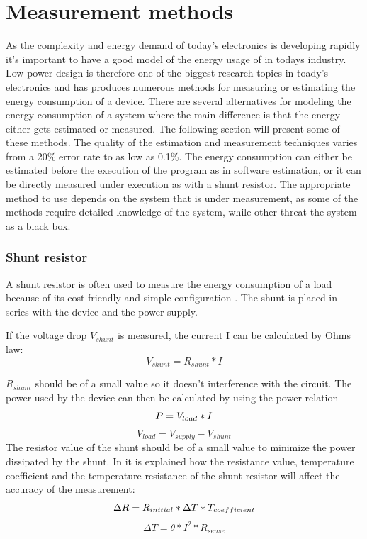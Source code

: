 \section{Measurement methods}
As the complexity and energy demand of today's electronics is developing rapidly it's  important to have a good model of the energy usage of in todays industry. Low-power design is therefore one of the biggest research topics in toady's electronics and has produces numerous methods for measuring or estimating the energy consumption of a device. There are several alternatives for modeling the energy consumption of a system where the main difference is that the energy either gets estimated or measured. The following section will present some of these methods. The quality of the estimation and measurement techniques varies from a 20\% error rate to as low as 0.1\%.  The energy consumption can either be estimated before the execution of the program as in software estimation, or it can be directly measured under execution as with a shunt resistor. The appropriate method to use depends on the system that is under measurement, as some of the methods require detailed knowledge of the system, while other threat the system as a black box.
\subsubsection{Shunt resistor}
A shunt resistor is often used to measure the energy consumption of a load because of its cost friendly and simple configuration \cite{Intersil} \cite{Infineon} \cite{Vishay}. The shunt is placed in series with the device and the power supply.

If the voltage drop $V_{shunt}$ is measured, the current I can be calculated by Ohms law:\begin{equation}
V_{shunt}=R_{shunt}*I
\end{equation}

$R_{shunt}$ should be of a small value so it doesn't interference with the circuit. The power used by the device can then be calculated by using the power relation \begin{equation}
P=V_{load}*I \\
\end{equation}
\begin{equation}
V_{load}= V_{supply}-V_{shunt}
\end{equation}
\newline The resistor value of the shunt should be of a small value to minimize the power dissipated by the shunt. In \cite{Intersil} it is explained how the resistance value, temperature coefficient and the temperature resistance of the shunt resistor will affect the accuracy of the measurement:
\begin{equation}
\Delta R= R_{initial}* \Delta T * T_{coefficient}\\
\label{rchange}
\end{equation}
\begin{equation}
 \Delta T = \theta * I^{2}*R_{sense}
\end{equation}

